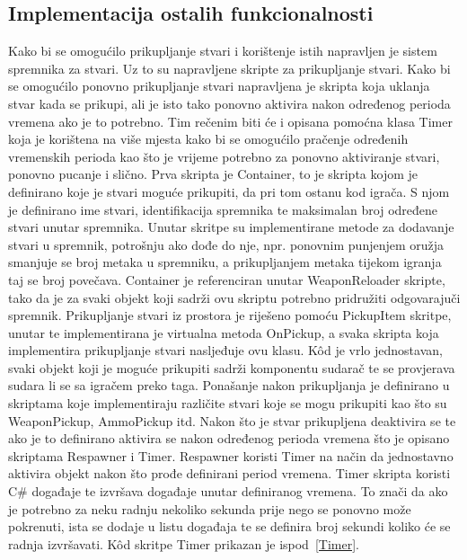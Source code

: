 \subsection{Implementacija ostalih funkcionalnosti}
Kako bi se omogućilo prikupljanje stvari i korištenje istih napravljen je sistem spremnika za stvari. Uz to su napravljene skripte za prikupljanje stvari. Kako bi se omogućilo ponovno prikupljanje stvari napravljena je skripta koja uklanja stvar kada se prikupi, ali je isto tako ponovno aktivira nakon određenog perioda vremena ako je to potrebno. Tim rečenim biti će i opisana pomoćna klasa Timer koja je korištena na više mjesta kako bi se omogućilo pračenje određenih vremenskih perioda kao što je vrijeme potrebno za ponovno aktiviranje stvari, ponovno pucanje i slično.
Prva skripta je Container, to je skripta kojom je definirano koje je stvari moguće prikupiti, da pri tom ostanu kod igrača. S njom je definirano ime stvari, identifikacija spremnika te maksimalan broj određene stvari unutar spremnika. Unutar skritpe su implementirane metode za dodavanje stvari u spremnik, potrošnju ako dođe do nje, npr. ponovnim punjenjem oružja smanjuje se broj metaka u spremniku, a prikupljanjem metaka tijekom igranja taj se broj povečava. Container je referenciran unutar WeaponReloader skripte, tako da je za svaki objekt koji sadrži ovu skriptu potrebno pridružiti odgovarajuči spremnik. 
Prikupljanje stvari iz prostora je riješeno pomoću PickupItem skritpe, unutar te implementirana je virtualna metoda OnPickup, a svaka skripta koja implementira prikupljanje stvari nasljeđuje ovu klasu. K\^od je vrlo jednostavan, svaki objekt koji je moguće prikupiti sadrži komponentu sudarač te se provjerava sudara li se sa igračem preko taga. Ponašanje nakon prikupljanja je definirano u skriptama koje implementiraju različite stvari koje se mogu prikupiti kao što su WeaponPickup, AmmoPickup itd. Nakon što je stvar prikupljena deaktivira se te ako je to definirano aktivira se nakon određenog perioda vremena što je opisano skriptama Respawner i Timer. Respawner koristi Timer na način da jednostavno aktivira objekt nakon što prođe definirani period vremena. Timer skripta koristi C\# događaje te izvršava događaje unutar definiranog vremena. To znači da ako je potrebno za neku radnju nekoliko sekunda prije nego se ponovno može pokrenuti, ista se dodaje u listu događaja te se definira broj sekundi koliko će se radnja izvršavati. K\^od skritpe Timer prikazan je ispod~\ref{Timer}.
